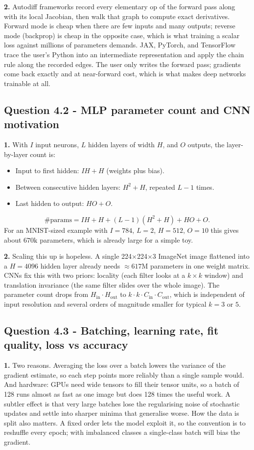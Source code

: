 \documentclass[11pt,a4paper]{article}
\newcommand{\Q}[1]{\subsection*{Question #1}}
\newcommand{\Qpart}[1]{\textbf{#1.}}
\begin{document}
\Qpart{2} Autodiff frameworks record every elementary op of the forward pass along with its local Jacobian, then walk that graph to compute exact derivatives. Forward mode is cheap when there are few inputs and many outputs; reverse mode (backprop) is cheap in the opposite case, which is what training a scalar loss against millions of parameters demands. JAX, PyTorch, and TensorFlow trace the user's Python into an intermediate representation and apply the chain rule along the recorded edges. The user only writes the forward pass; gradients come back exactly and at near-forward cost, which is what makes deep networks trainable at all.

\Q{4.2 - MLP parameter count and CNN motivation}

\Qpart{1} With $I$ input neurons, $L$ hidden layers of width $H$, and $O$ outputs, the layer-by-layer count is:
\begin{itemize}\setlength\itemsep{0pt}
    \item Input to first hidden: $I H + H$ (weights plus bias).
    \item Between consecutive hidden layers: $H^2 + H$, repeated $L{-}1$ times.
    \item Last hidden to output: $H O + O$.
\end{itemize}
\[
\#\text{params} = IH + H + (L{-}1)(H^2 + H) + HO + O.
\]
For an MNIST-sized example with $I=784$, $L=2$, $H=512$, $O=10$ this gives about $670\text{k}$ parameters, which is already large for a simple toy.

\Qpart{2} Scaling this up is hopeless. A single 224$\times$224$\times$3 ImageNet image flattened into a $H=4096$ hidden layer already needs $\approx\!617$M parameters in one weight matrix. CNNs fix this with two priors: locality (each filter looks at a $k{\times}k$ window) and translation invariance (the same filter slides over the whole image). The parameter count drops from $H_{\text{in}} \cdot H_{\text{out}}$ to $k \cdot k \cdot C_{\text{in}} \cdot C_{\text{out}}$, which is independent of input resolution and several orders of magnitude smaller for typical $k = 3$ or $5$.

\Q{4.3 - Batching, learning rate, fit quality, loss vs accuracy}

\Qpart{1} Two reasons. Averaging the loss over a batch lowers the variance of the gradient estimate, so each step points more reliably than a single sample would. And hardware: GPUs need wide tensors to fill their tensor units, so a batch of 128 runs almost as fast as one image but does 128 times the useful work. A subtler effect is that very large batches lose the regularising noise of stochastic updates and settle into sharper minima that generalise worse. How the data is split also matters. A fixed order lets the model exploit it, so the convention is to reshuffle every epoch; with imbalanced classes a single-class batch will bias the gradient.
\end{document}
